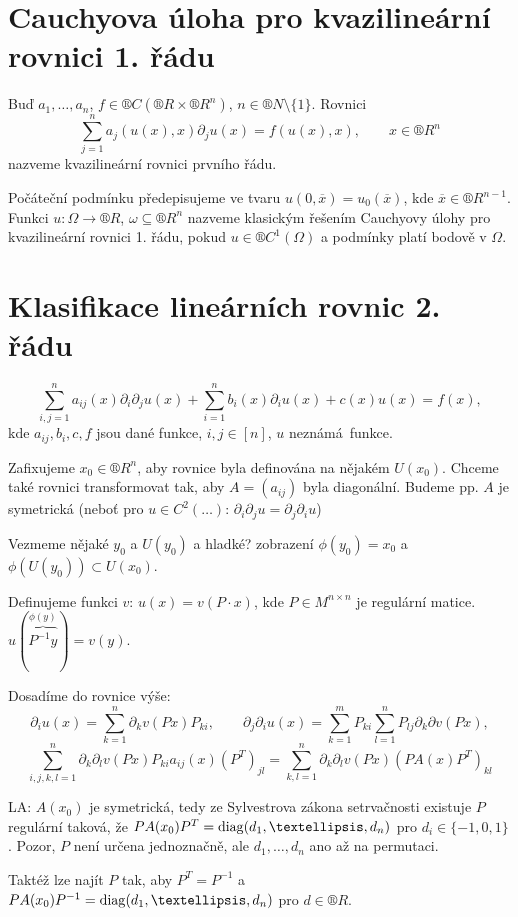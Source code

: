 \documentclass[12pt]{article}					%
\begin{document}
\section{Cauchyova úloha pro kvazilineární rovnici 1. řádu}
\begin{definice}
	Buď $a_1, …, a_n$, $f \in ®C(®R \times ®R^n)$, $n \in ®N \setminus \{1\}$. Rovnici
	$$ \sum_{j=1}^n a_j(u(x), x) \partial_j u(x) = f(u(x), x), \qquad x \in ®R^n $$
	nazveme kvazilineární rovnici prvního řádu.

	Počáteční podmínku předepisujeme ve tvaru $u(0, \overline{x}) = u_0(\overline{x})$, kde $\overline{x} \in ®R^{n-1}$. Funkci $u : \Omega \rightarrow ®R$, $\omega \subseteq ®R^n$ nazveme klasickým řešením Cauchyovy úlohy pro kvazilineární rovnici 1. řádu, pokud $u \in ®C^1(\Omega)$ a podmínky platí bodově v $\Omega$.
\end{definice}

\section{Klasifikace lineárních rovnic 2. řádu}
\begin{poznamka}
	$$ \sum_{i,j = 1}^n a_{ij}(x) \partial_i\partial_j u(x) + \sum_{i=1}^n b_i(x) \partial_i u(x) + c(x)u(x) = f(x), $$
	kde $a_{ij}, b_i, c, f$ jsou dané funkce, $i, j \in [n]$, $u$ neznámá funkce.

	Zafixujeme $x_0 \in ®R^n$, aby rovnice byla definována na nějakém $U(x_0)$. Chceme také rovnici transformovat tak, aby $A = (a_{ij})$ byla diagonální. Budeme pp. $A$ je symetrická (neboť pro $u \in C^2(…)$: $\partial_i\partial_j u = \partial_j\partial_i u$)
\end{poznamka}

\begin{definice}
	Vezmeme nějaké $y_0$ a $U(y_0)$ a hladké? zobrazení $\phi(y_0) = x_0$ a $\phi(U(y_0)) \subset U(x_0)$.

	Definujeme funkci $v$: $u(x) = v(P·x)$, kde $P \in M^{n \times n}$ je regulární matice. $u(\overbrace{P^{-1}y}^{\phi(y)}) = v(y)$.

	Dosadíme do rovnice výše:
	$$ \partial_i u(x) = \sum_{k=1}^n \partial_k v (P x) P_{ki}, \qquad \partial_j\partial_i u(x) = \sum_{k=1}^m P_{ki} \sum_{l=1}^n P_{lj} \partial_k\partial v(P x), $$
	$$ \sum_{i,j,k,l=1}^n \partial_k\partial_l v(P x) P_{ki} a_{ij}(x) (P^T)_{jl} = \sum_{k, l = 1}^n \partial_k\partial_l v(P x) (PA(x)P^T)_{kl} $$

	LA: $A(x_0)$ je symetrická, tedy ze Sylvestrova zákona setrvačnosti existuje $P$ regulární taková, že $P A(x_0) P^T = \diag(d_1, …, d_n)$ pro $d_i \in \{-1, 0, 1\}$. Pozor, $P$ není určena jednoznačně, ale $d_1, …, d_n$ ano až na permutaci.

	Taktéž lze najít $P$ tak, aby $P^T = P^{-1}$ a $PA(x_0)P^{-1} = \diag(d_1, …, d_n)$ pro $d \in ®R$.
\end{definice}
\end{document}
